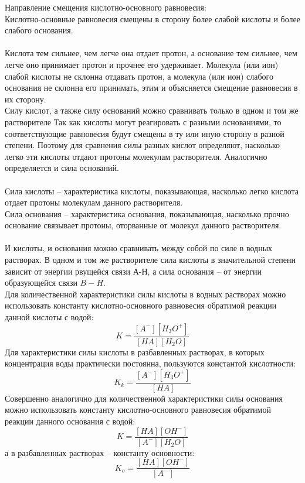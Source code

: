 \documentclass[14pt,a4paper]{scrartcl}
\begin{document}
Направление смещения кислотно-основного равновесия:\\
Кислотно-основные равновесия смещены в сторону более слабой кислоты и более слабого основания.\\\\
Кислота тем сильнее, чем легче она отдает протон, а основание тем сильнее, чем легче оно принимает протон и прочнее его удерживает. Молекула (или ион) слабой кислоты не склонна отдавать протон, а молекула (или ион) слабого основания не склонна его принимать, этим и объясняется смещение равновесия в их сторону.\\
Силу кислот, а также силу оснований можно сравнивать только в одном и том же растворителе
Так как кислоты могут реагировать с разными основаниями, то соответствующие равновесия будут смещены в ту или иную сторону в разной степени. Поэтому для сравнения силы разных кислот определяют, насколько легко эти кислоты отдают протоны молекулам растворителя. Аналогично определяется и сила оснований. \\\\
Сила кислоты – характеристика кислоты, показывающая, насколько легко кислота отдает протоны молекулам данного растворителя. \\
Сила основания – характеристика основания, показывающая, насколько прочно основание связывает протоны, оторванные от молекул данного растворителя. \\\\
И кислоты, и основания можно сравнивать между собой по силе в водных растворах. В одном и том же растворителе сила кислоты в значительной степени зависит от энергии рвущейся связи А-Н, а сила основания – от энергии образующейся связи $B-H$. \\
Для количественной характеристики силы кислоты в водных растворах можно использовать константу кислотно-основного равновесия обратимой реакции данной кислоты с водой: 
$$K = \frac{\left[A^-\right]\left[H_3O^+\right]}{\left[HA\right]\left[H_2O\right]}$$
Для характеристики силы кислоты в разбавленных растворах, в которых концентрация воды практически постоянна, пользуются константой кислотности: 
$$K_k = \frac{\left[A^-\right]\left[H_3O^+\right]}{\left[HA\right]}$$
Совершенно аналогично для количественной характеристики силы основания можно использовать константу кислотно-основного равновесия обратимой реакции данного основания с водой:
$$K = \frac{\left[HA\right]\left[OH^-\right]}{\left[A^-\right]\left[H_2O\right]}$$
а в разбавленных растворах – константу основности: 
$$K_o = \frac{\left[HA\right]\left[OH^-\right]}{\left[A^-\right]}$$
\end{document}
